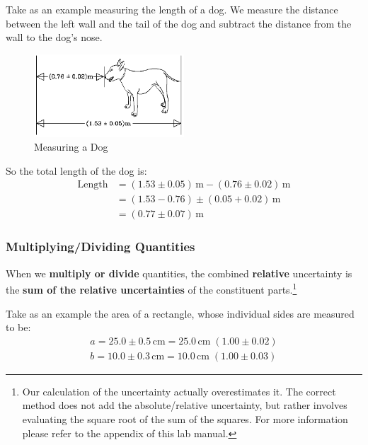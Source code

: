 Take as an example measuring the length of a dog. We measure the distance between the left wall and the tail of the dog and subtract the distance from the wall to the dog's nose.
\begin{figure}[h]
    \begin{center}
        \includegraphics[width=0.5\textwidth]{./Exp1-2/pic/image2.png}
    \end{center}
    \caption{Measuring a Dog}
    \label{fig:dog}
\end{figure}
So the total length of the dog is:
\begin{equation}
    \begin{split}
        \text{Length} &= (1.53\pm 0.05)\,\mathrm{m} - (0.76 \pm 0.02)\,\mathrm{m} \\
        &= \left( 1.53 - 0.76 \right)\pm\left( 0.05 + 0.02 \right)\,\mathrm{m} \\
        &= \left( 0.77 \pm 0.07 \right)\,\mathrm{m}
    \end{split}
\end{equation}

\subsubsection{Multiplying/Dividing Quantities}

When we \textbf{multiply or divide} quantities, the combined \textbf{relative} uncertainty is the \textbf{sum of the relative uncertainties} of the constituent parts.\footnote{Our calculation of the uncertainty actually overestimates it. The correct method does not add the absolute/relative uncertainty, but rather involves evaluating the square root of the sum of the squares. For more information please refer to the appendix of this lab manual.}

Take as an example the area of a rectangle, whose individual sides are measured to be:
\begin{align}
    a = 25.0\pm 0.5\,\mathrm{cm} = 25.0\,\mathrm{cm}\;(1.00\pm 0.02) \nonumber \\
    b = 10.0\pm 0.3\,\mathrm{cm} = 10.0\,\mathrm{cm}\;(1.00\pm 0.03)
\end{align}

